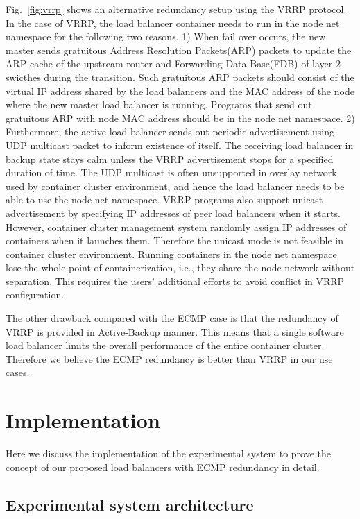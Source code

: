 Fig.~\ref{fig:vrrp} shows an alternative redundancy setup using the VRRP protocol.
In the case of VRRP, the load balancer container needs to run in the node net namespace for the following two reasons.
1) When fail over occurs, the new master sends gratuitous Address Resolution Packets(ARP) packets to update the ARP cache of the upstream router and Forwarding Data Base(FDB) of layer 2 swicthes during the transition.
Such gratuitous ARP packets should consist of the virtual IP address shared by the load balancers and the MAC address of the node where the new master load balancer is running.
Programs that send out gratuitous ARP with node MAC address should be in the node net namespace.
%
2) Furthermore, the active load balancer sends out periodic advertisement using UDP multicast packet to inform existence of itself.
The receiving load balancer in backup state stays calm unless the VRRP advertisement stops for a specified duration of time.
The UDP multicast is often unsupported in overlay network used by container cluster environment, and hence the load balancer needs to be able to use the node net namespace.
%
VRRP programs also support unicast advertisement by specifying IP addresses of peer load balancers when it starts.
However, container cluster management system randomly assign IP addresses of containers when it launches them.
Therefore the unicast mode is not feasible in container cluster environment.
%
Running containers in the node net namespace lose the whole point of containerization, i.e., they share the node network without separation.
This requires the users' additional efforts to avoid conflict in VRRP configuration.

The other drawback compared with the ECMP case is that the redundancy of VRRP is provided in Active-Backup manner.
This means that a single software load balancer limits the overall performance of the entire container cluster.
Therefore we believe the ECMP redundancy is better than VRRP in our use cases.

\section{Implementation}\label{Implementation}

Here we discuss the implementation of the experimental system to prove the concept of our proposed load balancers with ECMP redundancy in detail.

\subsection{Experimental system architecture}

